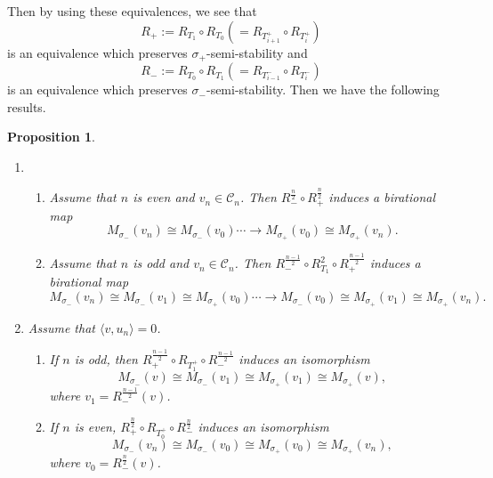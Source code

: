 \documentclass[leqno,11pt]{amsart}
\newtheorem{Prop}[Thm]{Proposition}
\theoremstyle{definition}
\def\CC{\ensuremath{\mathcal C}}
\begin{document}
Then by using these equivalences, we see that
\begin{equation}
R_+:=R_{T_1} \circ R_{T_0} (=R_{T_{i+1}^+} \circ R_{T_i^+}) 
\end{equation}
is an equivalence which preserves $\sigma_+$-semi-stability
and
\begin{equation}
R_-:=R_{T_0} \circ R_{T_1} (=R_{T_{i-1}^-} \circ R_{T_i^-}) 
\end{equation}
is an equivalence which preserves $\sigma_-$-semi-stability.
Then we have the following results.



\begin{Prop}\label{Prop:CompositionSphericalExceptional}
\begin{enumerate}
\item[(1)]
\begin{enumerate}
\item
Assume that $n$ is even and $v_n \in \CC_n$.
Then $R_-^{\frac{n}{2}} \circ R_+^{\frac{n}{2}}$ induces a birational map
\begin{equation}
M_{\sigma_-}(v_n) \cong M_{\sigma_-}(v_0) \cdots \to M_{\sigma_+}(v_0)
\cong M_{\sigma_+}(v_n).
\end{equation}
\item
Assume that $n$ is odd and $v_n \in \CC_n$.
Then $R_-^{\frac{n-1}{2}} \circ R_{T_1}^2 \circ R_+^{\frac{n-1}{2}}$ induces a birational map
\begin{equation}
M_{\sigma_-}(v_n) \cong M_{\sigma_-}(v_1) \cong M_{\sigma_+}(v_0) 
\cdots \to M_{\sigma_-}(v_0) \cong M_{\sigma_+}(v_1)
\cong M_{\sigma_+}(v_n).
\end{equation}
\end{enumerate}
\item[(2)]
Assume that $\langle v, u_n \rangle=0$.
\begin{enumerate}
\item
If $n$ is odd, then 
$R_+^{\frac{n-1}{2}} \circ R_{T_1^+}
\circ R_-^{\frac{n-1}{2}}$ induces
an isomorphism
\begin{equation}
M_{\sigma_-}(v) \cong M_{\sigma_-}(v_1) \cong M_{\sigma_+}(v_1) 
\cong M_{\sigma_+}(v),
\end{equation}
where $v_1=R_-^{\frac{n-1}{2}}(v)$.
\item
If $n$ is even, 
$R_+^{\frac{n}{2}} \circ R_{T_0^+}
\circ R_-^{\frac{n}{2}}$ induces
an isomorphism
\begin{equation}
M_{\sigma_-}(v_{n}) \cong M_{\sigma_-}(v_0) \cong M_{\sigma_+}(v_0) 
\cong M_{\sigma_+}(v_{n}),
\end{equation}
where $v_0=R_-^{\frac{n}{2}}(v)$.
\end{enumerate}
\end{enumerate}
\end{Prop}
\end{document}

